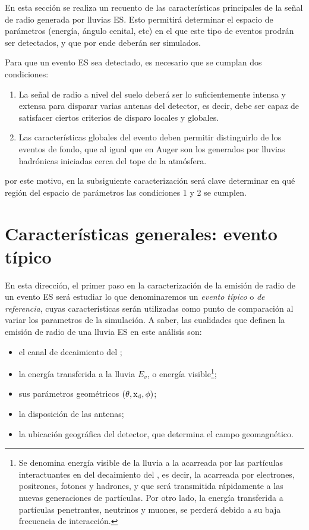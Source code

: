 En esta secci\'on se realiza un recuento de las caracter\'isticas principales de la se\~nal de radio generada por lluvias ES.
Esto permitir\'a determinar el espacio de par\'ametros (energ\'ia, \'angulo cenital, etc) en el que este tipo de eventos prodr\'an ser detectados, y que por ende deber\'an ser simulados.

Para que un evento ES sea detectado, es necesario que se cumplan dos condiciones:
\begin{enumerate}
 \item La se\~nal de radio a nivel del suelo deber\'a ser lo suficientemente intensa y extensa para disparar varias antenas del detector, es decir, debe ser capaz de satisfacer ciertos criterios de disparo locales y globales.
 \item Las caracter\'isticas globales del evento deben permitir distinguirlo de los eventos de fondo, que al igual que en Auger son los generados por lluvias hadr\'onicas iniciadas cerca del tope de la atm\'osfera.
\end{enumerate}
por este motivo, en la subsiguiente caracterizaci\'on ser\'a clave determinar en qu\'e regi\'on del espacio de par\'ametros las condiciones 1 y 2 se cumplen.

	\section{Caracter\'isticas generales: evento típico}
	
	En esta direcci\'on, el primer paso en la caracterizaci\'on de la emisión de radio de un evento ES ser\'a estudiar lo que denominaremos un \emph{evento típico} o \emph{de referencia}, cuyas caracter\'isticas ser\'an utilizadas como punto de comparaci\'on al variar los parametros de la simulaci\'on. 
	A saber, las cualidades que definen la emisi\'on de radio de una lluvia ES en este an\'alisis son: 
	\begin{itemize}
	 \item el canal de decaimiento del \tauon{};
	 \item la energía transferida a la lluvia $E_v$, o energ\'ia visible\footnote{Se denomina energ\'ia visible de la lluvia a la acarreada por las part\'iculas interactuantes en del decaimiento del \tauon{}, es decir, la acarreada por electrones, positrones, fotones y hadrones, y que ser\'a transmitida r\'apidamente a las nuevas generaciones de part\'iculas. Por otro lado, la energ\'ia transferida a part\'iculas penetrantes, neutrinos y muones, se perder\'a debido a su baja frecuencia de interacci\'on.};
	 \item sus parámetros geométricos $(\theta,{\rm x_d},\phi)$;
	 \item la disposici\'on de las antenas;
	 \item la ubicaci\'on geogr\'afica del detector, que determina el campo geomagn\'etico.
	 
	\end{itemize}

